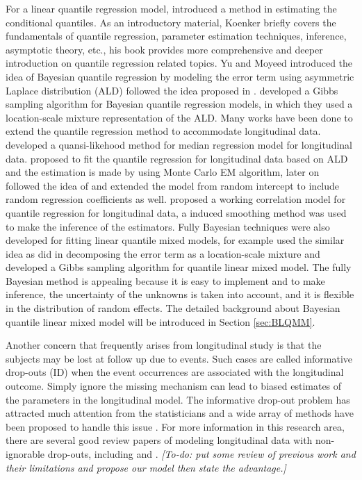 \documentclass{article}
\begin{document}
For a linear quantile regression model, \cite{koenker1978regression} introduced a method in estimating the conditional quantiles. As an introductory material, Koenker \cite{koenker2001quantile} briefly covers the fundamentals of quantile regression, parameter estimation techniques, inference, asymptotic theory, etc., his book \cite{koenker2005quantile} provides more comprehensive and deeper introduction on quantile regression related topics.  Yu and Moyeed \cite{yu2001bayesian} introduced the idea of Bayesian quantile regression by modeling the error term using asymmetric Laplace distribution (ALD) followed the idea proposed in \cite{koenker1978regression}. \cite{kozumi2011gibbs} developed a Gibbs sampling algorithm for Bayesian quantile regression models, in which they used a location-scale mixture representation of the ALD. Many works have been done to extend the quantile regression method to accommodate longitudinal data. \cite{jung1996quasi} developed a quansi-likehood method for median regression model for longitudinal data. \cite{geraci2007quantile} proposed to fit the quantile regression for longitudinal data based on ALD and the estimation is made by using Monte Carlo EM algorithm, later on \cite{liu2009mixed} followed the idea of \cite{geraci2007quantile} and extended the model from random intercept to include random regression coefficients as well. \cite{fu2012quantile} proposed  a working correlation model for quantile regression for longitudinal data, a induced smoothing method was used to make the inference of the estimators. Fully Bayesian techniques were also developed for fitting linear quantile mixed models, for example \cite{luo2012bayesian} used the similar idea as \cite{kozumi2011gibbs} did in decomposing the error term as a location-scale mixture and developed a Gibbs sampling algorithm for quantile linear mixed model. The fully Bayesian method is appealing because it is easy to implement and to make inference, the uncertainty of the unknowns is taken into account, and it is flexible in the distribution of random effects. The detailed background about Bayesian quantile linear mixed model will be introduced in Section \ref{sec:BLQMM}.\par

Another concern that frequently arises from longitudinal study is that the subjects may be lost at follow up due to events. Such cases are called informative drop-outs (ID) when the event occurrences are associated with the longitudinal outcome. Simply ignore the missing mechanism can lead to biased estimates of the parameters in the longitudinal model. The informative drop-out problem has attracted much attention from the statisticians and a wide array of methods have been proposed to handle this issue \cite{diggle1994informative} \cite{lipsitz1997quantile} \cite{touloumi2003comparison} \cite{yuan2010bayesian}. For more information in this research area, there are several good review papers of modeling longitudinal data with non-ignorable drop-outs, including \cite{diggle2007analysis} and \cite{hogan2004handling}. \emph{[To-do: put some review of previous work and their limitations and propose our model then state the advantage.]}
\end{document}

